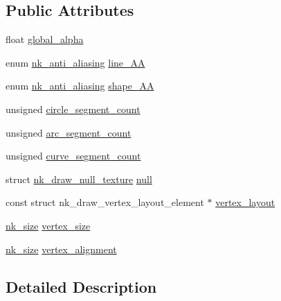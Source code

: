 \subsection*{Public Attributes}
\begin{DoxyCompactItemize}
\item 
float \mbox{\hyperlink{structnk__convert__config_ad344c555b0c1ce0a07dded48860ceb00}{global\+\_\+alpha}}
\item 
enum \mbox{\hyperlink{nuklear_8h_a9b070460af54cd26421eb7d000956f38}{nk\+\_\+anti\+\_\+aliasing}} \mbox{\hyperlink{structnk__convert__config_a7279543367b1ad0e5f183491233cedad}{line\+\_\+\+AA}}
\item 
enum \mbox{\hyperlink{nuklear_8h_a9b070460af54cd26421eb7d000956f38}{nk\+\_\+anti\+\_\+aliasing}} \mbox{\hyperlink{structnk__convert__config_a1d0cf3e01234c636729dfd0fddf5b2c7}{shape\+\_\+\+AA}}
\item 
unsigned \mbox{\hyperlink{structnk__convert__config_ae62d641bf9c5bc6b3e66c6071f4a8267}{circle\+\_\+segment\+\_\+count}}
\item 
unsigned \mbox{\hyperlink{structnk__convert__config_ae367d812c2f866e843f9684b3a920e73}{arc\+\_\+segment\+\_\+count}}
\item 
unsigned \mbox{\hyperlink{structnk__convert__config_afcf45f3fc6e3f043b572b59cb04424c5}{curve\+\_\+segment\+\_\+count}}
\item 
struct \mbox{\hyperlink{structnk__draw__null__texture}{nk\+\_\+draw\+\_\+null\+\_\+texture}} \mbox{\hyperlink{structnk__convert__config_af4200766d63d131134251aa67fe76579}{null}}
\item 
const struct nk\+\_\+draw\+\_\+vertex\+\_\+layout\+\_\+element $\ast$ \mbox{\hyperlink{structnk__convert__config_addeb894f54f2ba1dbe3d5bf887b27776}{vertex\+\_\+layout}}
\item 
\mbox{\hyperlink{nuklear_8h_a84c0fc50dec5501be327b33d41d9010c}{nk\+\_\+size}} \mbox{\hyperlink{structnk__convert__config_acf0d9e08220c6e29ee9d2753f9273591}{vertex\+\_\+size}}
\item 
\mbox{\hyperlink{nuklear_8h_a84c0fc50dec5501be327b33d41d9010c}{nk\+\_\+size}} \mbox{\hyperlink{structnk__convert__config_a92519fe62ef0e8f0d7180dbd874c775f}{vertex\+\_\+alignment}}
\end{DoxyCompactItemize}


\subsection{Detailed Description}


